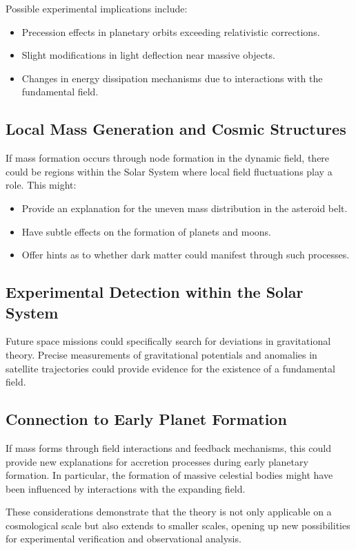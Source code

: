 \documentclass[a4paper,11pt]{article}
\begin{document}
Possible experimental implications include:
\begin{itemize}
	\item Precession effects in planetary orbits exceeding relativistic corrections.
	\item Slight modifications in light deflection near massive objects.
	\item Changes in energy dissipation mechanisms due to interactions with the fundamental field.
\end{itemize}

\subsection{Local Mass Generation and Cosmic Structures}
If mass formation occurs through node formation in the dynamic field, there could be regions within the Solar System where local field fluctuations play a role. This might:
\begin{itemize}
	\item Provide an explanation for the uneven mass distribution in the asteroid belt.
	\item Have subtle effects on the formation of planets and moons.
	\item Offer hints as to whether dark matter could manifest through such processes.
\end{itemize}

\subsection{Experimental Detection within the Solar System}
Future space missions could specifically search for deviations in gravitational theory. Precise measurements of gravitational potentials and anomalies in satellite trajectories could provide evidence for the existence of a fundamental field.

\subsection{Connection to Early Planet Formation}
If mass forms through field interactions and feedback mechanisms, this could provide new explanations for accretion processes during early planetary formation. In particular, the formation of massive celestial bodies might have been influenced by interactions with the expanding field.

These considerations demonstrate that the theory is not only applicable on a cosmological scale but also extends to smaller scales, opening up new possibilities for experimental verification and observational analysis.
\end{document}
